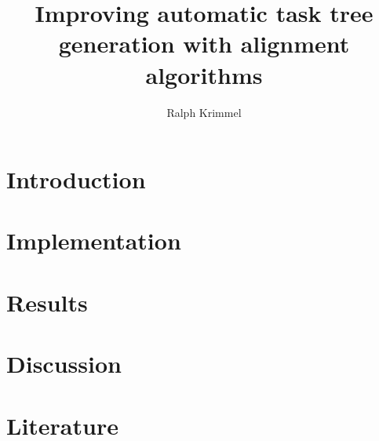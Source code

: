 \documentclass{scrartcl}
\title{Improving automatic task tree generation with alignment algorithms}
\author{Ralph Krimmel}
\begin{document}
\maketitle


\newcommand{\beginsupplement}{%
	\setcounter{table}{0}
	\renewcommand{\thetable}{\Roman{table}}%
	\setcounter{figure}{0}
	\renewcommand{\thefigure}{\Roman{figure}}%
}



\clearpage
\thispagestyle{empty}


\setcounter{page}{3}
\tableofcontents


\clearpage
\section{Introduction}


\clearpage
\section{Implementation}


\clearpage
\section{Results}
\label{sec:ergebnisse}


\clearpage
\section{Discussion}


%

%

\clearpage
\section*{Literature}


\end{document}
